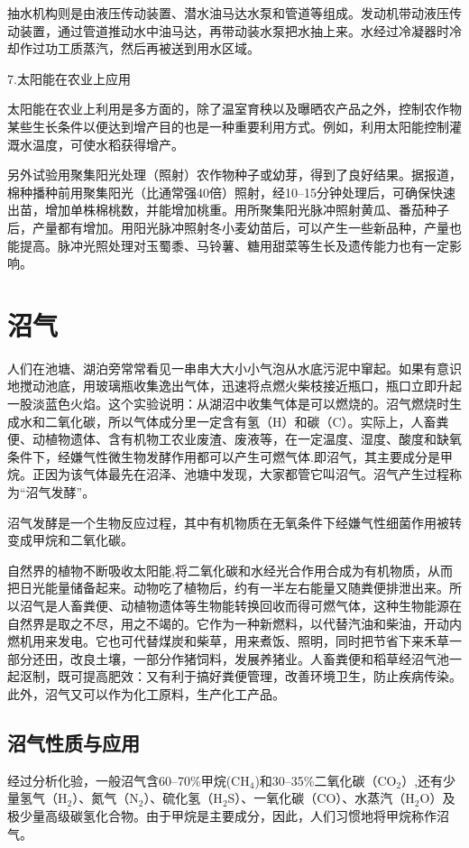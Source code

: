 \documentclass{ctexbook}
\begin{document}
抽水机构则是由液压传动装置、潜水油马达水泵和管道等组成。发动机带动液压传动装置，通过管道推动水中油马达，再带动装水泵把水抽上来。水经过冷凝器时冷却作过功工质蒸汽，然后再被送到用水区域。

7.太阳能在农业上应用

太阳能在农业上利用是多方面的，除了温室育秧以及曝晒农产品之外，控制农作物某些生长条件以便达到增产目的也是一种重要利用方式。例如，利用太阳能控制灌溉水温度，可使水稻获得增产。

另外试验用聚集阳光处理（照射）农作物种子或幼芽，得到了良好结果。据报道，棉种播种前用聚集阳光（比通常强40倍）照射，经10--15分钟处理后，可确保快速出苗，增加单株棉桃数，并能增加桃重。用所聚集阳光脉冲照射黄瓜、番茄种子后，产量都有增加。用阳光脉冲照射冬小麦幼苗后，可以产生一些新品种，产量也能提高。脉冲光照处理对玉蜀黍、马铃薯、糖用甜菜等生长及遗传能力也有一定影响。
\section{沼气}
人们在池塘、湖泊旁常常看见一串串大大小小气泡从水底污泥中窜起。如果有意识地搅动池底，用玻璃瓶收集逸出气体，迅速将点燃火柴枝接近瓶口，瓶口立即升起一股淡蓝色火焰。这个实验说明：从湖沼中收集气体是可以燃烧的。沼气燃烧时生成水和二氧化碳，所以气体成分里一定含有氢（H）和碳（C）。实际上，人畜粪便、动植物遗体、含有机物工农业废渣、废液等，在一定温度、湿度、酸度和缺氧条件下，经嫌气性微生物发酵作用都可以产生可燃气体.即沼气，其主要成分是甲烷。正因为该气体最先在沼泽、池塘中发现，大家都管它叫沼气。沼气产生过程称为“沼气发酵”。

沼气发酵是一个生物反应过程，其中有机物质在无氧条件下经嫌气性细菌作用被转变成甲烷和二氧化碳。

自然界的植物不断吸收太阳能,将二氧化碳和水经光合作用合成为有机物质，从而把日光能量储备起来。动物吃了植物后，约有一半左右能量又随粪便排泄出来。所以沼气是人畜粪便、动植物遗体等生物能转换回收而得可燃气体，这种生物能源在自然界是取之不尽，用之不竭的。它作为一种新燃料，以代替汽油和柴油，开动内燃机用来发电。它也可代替煤炭和柴草，用来煮饭、照明，同时把节省下来禾草一部分还田，改良土壤，一部分作猪饲料，发展养猪业。人畜粪便和稻草经沼气池一起沤制，既可提高肥效：又有利于搞好粪便管理，改善环境卫生，防止疾病传染。此外，沼气又可以作为化工原料，生产化工产品。

\subsection{沼气性质与应用}

经过分析化验，一般沼气含60--70\%甲烷(CH$_4$)和30--35\%二氧化碳（CO$_2$）,还有少量氢气（H$_2$）、氮气（N$_2$）、硫化氢（H$_2$S）、一氧化碳（CO）、水蒸汽（H$_2$O）及极少量高级碳氢化合物。由于甲烷是主要成分，因此，人们习惯地将甲烷称作沼气。
\end{document}
